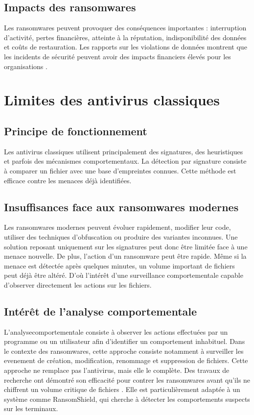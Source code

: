 \subsection{Impacts des ransomwares}

Les ransomwares peuvent provoquer des conséquences importantes : interruption d'activité, pertes financières, atteinte à la réputation, indisponibilité des données et coûts de restauration. Les rapports sur les violations de données montrent que les incidents de sécurité peuvent avoir des impacts financiers élevés pour les organisations \cite{ibmCostDataBreach2025}.

\section{Limites des antivirus classiques}

\subsection{Principe de fonctionnement}

Les antivirus classiques utilisent principalement des signatures, des heuristiques et parfois des mécanismes comportementaux. La détection par \gls{signature} consiste à comparer un fichier avec une base d'empreintes connues. Cette méthode est efficace contre les menaces déjà identifiées.

\subsection{Insuffisances face aux ransomwares modernes}

Les ransomwares modernes peuvent évoluer rapidement, modifier leur code, utiliser des techniques d'obfuscation ou produire des variantes inconnues. Une solution reposant uniquement sur les signatures peut donc être limitée face à une menace nouvelle. De plus, l'action d'un ransomware peut être rapide. Même si la menace est détectée après quelques minutes, un volume important de fichiers peut déjà être altéré. D'où l'intérêt d'une surveillance comportementale capable d'observer directement les actions sur les fichiers.

\subsection{Intérêt de l'analyse comportementale}

L'\gls{analysecomportementale} consiste à observer les actions effectuées par un programme ou un utilisateur afin d'identifier un comportement inhabituel. Dans le contexte des ransomwares, cette approche consiste notamment à surveiller les \gls{evenement} de création, modification, renommage et suppression de fichiers. Cette approche ne remplace pas l'antivirus, mais elle le complète. Des travaux de recherche ont démontré son efficacité pour contrer les ransomwares avant qu'ils ne chiffrent un volume critique de fichiers \cite{moussaileb2021survey,oz2022survey}. Elle est particulièrement adaptée à un système comme RansomShield, qui cherche à détecter les comportements suspects sur les terminaux.

